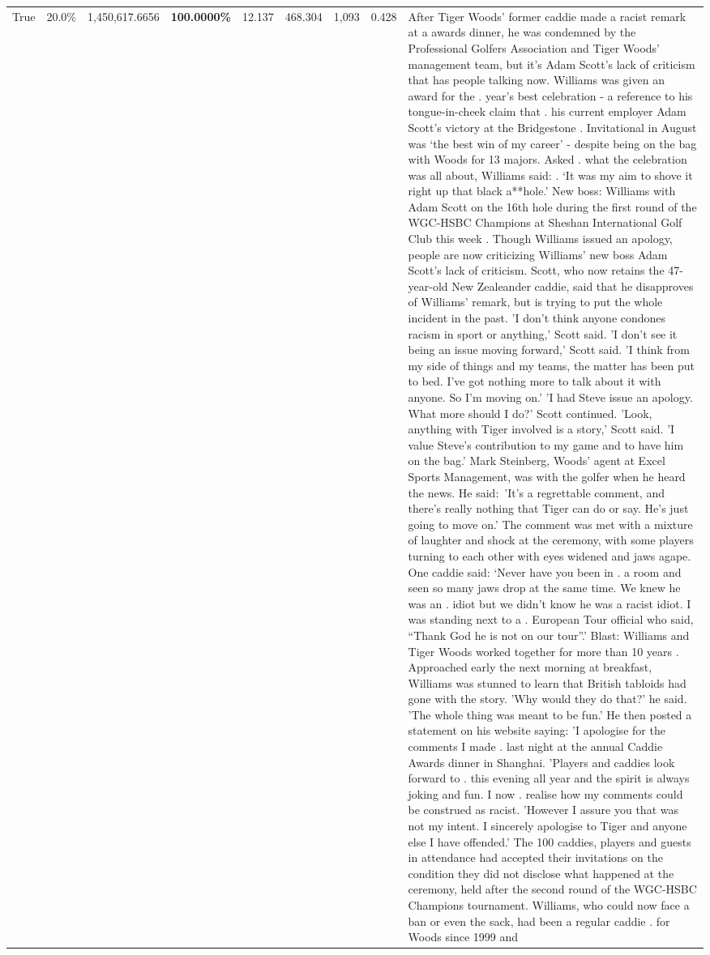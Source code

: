 \begin{table}[H]
\begin{tabular}{lllrlllll}
True & 20.0\% & 1,450,617.6656 & \bfseries \color{red} 100.0000\% & 12.137 & 468.304 & 1,093 & 0.428 & After Tiger Woods' former caddie made a racist remark at a awards dinner, he was condemned by the Professional Golfers Association and Tiger Woods' management team, but it's Adam Scott's lack of criticism that has people talking now. Williams was given an award for the . year’s best celebration - a reference to his tongue-in-cheek claim that . his current employer Adam Scott’s victory at the Bridgestone . Invitational in August was ‘the best win of my career’ - despite being on the bag with Woods for 13 majors. Asked . what the celebration was all about, Williams said: . ‘It was my aim to shove it right up that black a**hole.’ New boss: Williams with Adam Scott  on the 16th hole during the first round of the WGC-HSBC Champions at Sheshan International Golf Club this week . Though Williams issued an apology, people are now criticizing Williams' new boss Adam Scott's lack of criticism. Scott, who now retains the 47-year-old New Zealeander caddie, said that he disapproves of Williams' remark, but is trying to put the whole incident in the past. 'I don't think anyone condones racism in sport or anything,' Scott said. 'I don't see it being an issue moving forward,' Scott said. 'I think from my side of things and my teams, the matter has been put to bed. I've got nothing more to talk about it with anyone. So I'm moving on.' 'I had Steve issue an apology. What more should I do?' Scott continued. 'Look, anything with Tiger involved is a story,' Scott said. 'I value Steve's contribution to my game and to have him on the bag.' Mark Steinberg, Woods' agent at Excel Sports Management, was with the golfer when he heard the news. He said: 'It's a regrettable comment, and there's really nothing that Tiger can do or say. He's just going to move on.' The comment was met with a mixture of laughter and shock at the ceremony, with some players turning to each other with eyes widened and jaws agape. One caddie said: ‘Never have you been in . a room and seen so many jaws drop at the same time. We knew he was an . idiot but we didn’t know he was a racist idiot. I was standing next to a . European Tour official who said, “Thank God he is not on our tour”.’ Blast: Williams and Tiger Woods worked together for more than 10 years . Approached early the next morning at breakfast, Williams was stunned to learn that British tabloids had gone with the story. 'Why would they do that?' he said. 'The whole thing was meant to be fun.' He then posted a statement on his website saying: 'I apologise for the comments I made . last night at the annual Caddie Awards dinner in Shanghai. 'Players and caddies look forward to . this evening all year and the spirit is always joking and fun. I now . realise how my comments could be construed as racist. 'However I assure you that was not my intent. I sincerely apologise to Tiger and anyone else I have offended.' The 100 caddies, players and guests in attendance had accepted their invitations on the condition they did not disclose what happened at the ceremony, held after the second round of the WGC-HSBC Champions tournament. Williams, who could now face a ban or even the sack, had been a regular caddie . for Woods since 1999 and 
\end{tabular}
\end{table}
